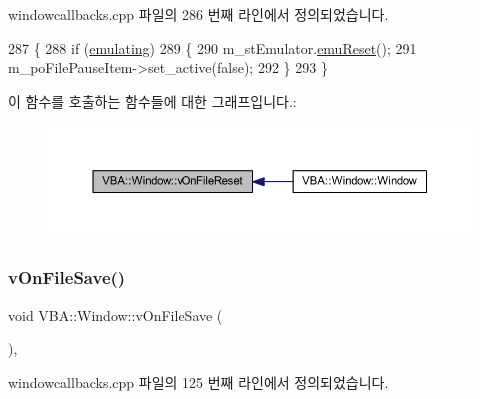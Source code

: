 windowcallbacks.\+cpp 파일의 286 번째 라인에서 정의되었습니다.


\begin{DoxyCode}
287 \{
288   \textcolor{keywordflow}{if} (\mbox{\hyperlink{gb_globals_8h_af9cc36078b1b311753963297ae7f2a74}{emulating}})
289   \{
290     m\_stEmulator.\mbox{\hyperlink{struct_emulated_system_ae79a9b5e75ec8b74ededbbaceac2d630}{emuReset}}();
291     m\_poFilePauseItem->set\_active(\textcolor{keyword}{false});
292   \}
293 \}
\end{DoxyCode}
이 함수를 호출하는 함수들에 대한 그래프입니다.\+:
\nopagebreak
\begin{figure}[H]
\begin{center}
\leavevmode
\includegraphics[width=350pt]{class_v_b_a_1_1_window_acd364daa2b85fc1c6b34d096305d8b48_icgraph}
\end{center}
\end{figure}
\mbox{\label{class_v_b_a_1_1_window_a27bb0ed15cc90758c95eb11fddd14a86}} 
\subsubsection{\texorpdfstring{v\+On\+File\+Save()}{vOnFileSave()}}
{\footnotesize\ttfamily void V\+B\+A\+::\+Window\+::v\+On\+File\+Save (\begin{DoxyParamCaption}{ }\end{DoxyParamCaption})\hspace{0.3cm}{\ttfamily [protected]}, {\ttfamily [virtual]}}



windowcallbacks.\+cpp 파일의 125 번째 라인에서 정의되었습니다.



